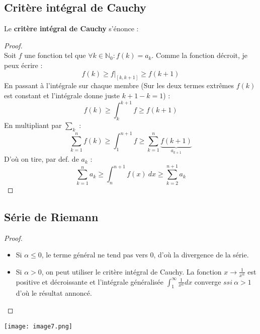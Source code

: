 \documentclass[british,french,11pt, a4paper, openany]{book}
\begin{document}
\subsection{Critère intégral de Cauchy}
Le \textbf{critère intégral de Cauchy} s'énonce :\\
		
			
\begin{proof}
	\ \\
	Soit $f$ une fonction tel que $\forall k \in \mathbb{N}_0 : f(k) = a_k$. Comme la fonction décroit, je peux  écrire :
	\begin{equation}
		f(k) \geq f|_{[k, k+1]} \geq f(k+1)
	\end{equation}
	En passant à l'intégrale sur chaque membre (Sur les deux termes extrêmes $f(k)$ est constant et l'intégrale donne juste $k+1-k = 1$) :
	\begin{equation}
		f(k) \geq \int_k^{k+1} f \geq f(k+1)
	\end{equation}
	En multipliant par $\sum_k$ :
	\begin{equation}
		\sum_{k=1}^n f(k) \geq \int_1^{n+1} f \geq \sum_{k=1}^n \underbrace{f(k+1)}_{a_{k+1}}
	\end{equation}
	D'où on tire, par def. de $a_k$ :
	\begin{equation}
		\sum_{k=1}^n a_k \geq \int_n^{n+1} f(x)\ dx \geq \sum_{k=2}^{n+1} a_k
	\end{equation}
\end{proof}
			
\setcounter{subsection}{4}
\subsection{Série de Riemann}
\begin{proof}\ \\
	\begin{itemize}
		\item Si $\alpha \leq 0$, le terme général ne tend pas vers 0, d'où la divergence de la série.
		\item Si $\alpha > 0$, on peut utiliser le critère intégral de Cauchy. La fonction $x \rightarrow \frac{1}{x^\alpha}$  est positive et décroissante et l'intégrale généralisée $\int_1^\infty \frac{1}{x^\alpha}dx$ converge $ssi\ \alpha > 1$ d'où le résultat annoncé.
	\end{itemize}
\end{proof}
\begin{center}
	\texttt{[image: image7.png]}
\end{center}
			
\end{document}
